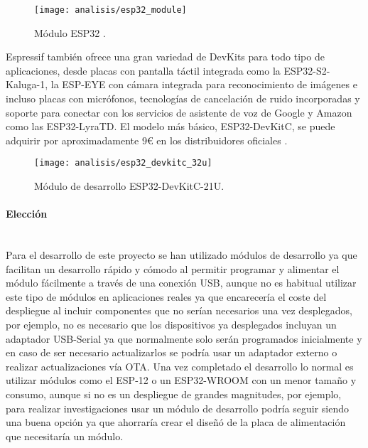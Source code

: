 \documentclass[../proyecto.tex]{subfiles}
\begin{document}
\begin{figure}[H]
\centering
\texttt{[image: analisis/esp32\_module]}
\caption{Módulo ESP32  \cite{esp32_module}.}
\label{fig:esp32_module}
\end{figure}

Espressif también ofrece una gran variedad de DevKits para todo tipo de aplicaciones, desde placas con pantalla táctil integrada como la ESP32-S2-Kaluga-1, la ESP-EYE con cámara integrada para reconocimiento de imágenes e incluso placas con micrófonos, tecnologías de cancelación de ruido incorporadas y soporte para conectar con los servicios de asistente de voz de Google y Amazon como las ESP32-LyraTD. El modelo más básico, ESP32-DevKitC, se puede adquirir por aproximadamente 9€ en los distribuidores oficiales \cite{espressif_provider_digikey} \cite{espressif_provider_mouser}.\\

\begin{figure}[H]
\centering
\texttt{[image: analisis/esp32\_devkitc\_32u]}
\caption{Módulo de desarrollo ESP32-DevKitC-21U.}
\label{fig:esp32_devkitc_32u}
\end{figure}

\paragraph{Elección}\mbox{}\\

Para el desarrollo de este proyecto se han utilizado módulos de desarrollo ya que facilitan un desarrollo rápido y cómodo al permitir programar y alimentar el módulo fácilmente a través de una conexión USB, aunque no es habitual utilizar este tipo de módulos en aplicaciones reales ya que encarecería el coste del despliegue al incluir componentes que no serían necesarios una vez desplegados, por ejemplo, no es necesario que los dispositivos ya desplegados incluyan un adaptador USB-Serial ya que normalmente solo serán programados inicialmente y en caso de ser necesario actualizarlos se podría usar un adaptador externo o realizar actualizaciones vía OTA. Una vez completado el desarrollo lo normal es utilizar módulos como el ESP-12 o un ESP32-WROOM con un menor tamaño y consumo, aunque si no es un despliegue de grandes magnitudes, por ejemplo, para realizar investigaciones usar un módulo de desarrollo podría seguir siendo una buena opción ya que ahorraría crear el diseñó de la placa de alimentación que necesitaría un módulo.\\
\end{document}

